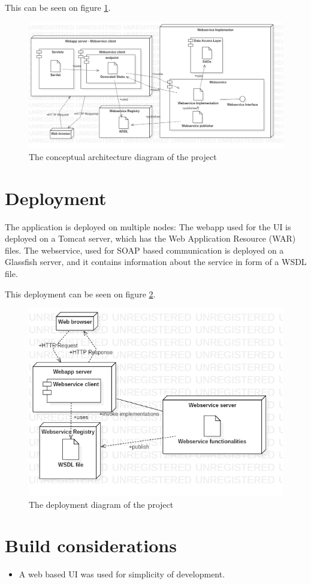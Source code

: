 \documentclass[a4paper,10pt]{report}
\begin{document}
This can be seen on figure \ref{fig:architecture_diagram}.

\begin{figure}[h]
    \centering
    \includegraphics[width=1\textwidth]{architecture_diagram.png}
    \caption{The conceptual architecture diagram of the project}
    \label{fig:architecture_diagram}
\end{figure}

\section{Deployment}
The application is deployed on multiple nodes:
The webapp used for the UI is deployed on a Tomcat server, which has the Web Application Resource (WAR) files.
The webservice, used for SOAP based communication is deployed on a Glassfish server, and it contains information about the service in form of a WSDL file.

This deployment can be seen on figure \ref{fig:deployment_diagram}.

\begin{figure}[h]
    \centering
    \includegraphics[width=1\textwidth]{deployment_diagram.png}
    \caption{The deployment diagram of the project}
    \label{fig:deployment_diagram}
\end{figure}

\section{Build considerations}
\begin{itemize}
    \item A web based UI was used for simplicity of development.
\end{itemize}
\end{document}
